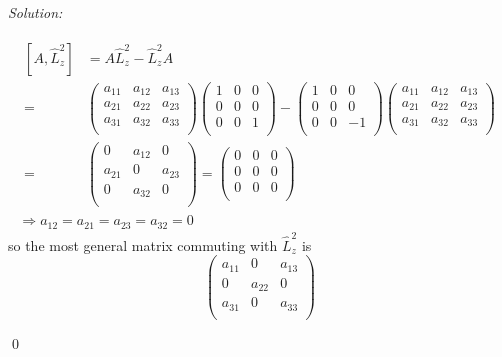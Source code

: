 \documentclass[12pt,a4paper]{article}
\newenvironment{sol}
    {\emph{Solution:}
    }
    {
    \qed
    }
\begin{document}
\begin{sol}
\begin{itemize}
\begin{gather}
\begin{align}
\nonumber[A,\hat{L}_z^2]&=A\hat{L}_z^2-\hat{L}_z^2A\\
\nonumber=&\left(\begin{array}{ccc}
a_{11}&a_{12}&a_{13}\\
a_{21}&a_{22}&a_{23}\\
a_{31}&a_{32}&a_{33}\\
\end{array}\right)\left(\begin{array}{ccc}
1&0&0\\
0&0&0\\
0&0&1\\
\end{array}\right)-\left(\begin{array}{ccc}
1&0&0\\
0&0&0\\
0&0&-1\\
\end{array}\right)\left(\begin{array}{ccc}
a_{11}&a_{12}&a_{13}\\
a_{21}&a_{22}&a_{23}\\
a_{31}&a_{32}&a_{33}\\
\end{array}\right)\\
=&\left(\begin{array}{ccc}
0&a_{12}&0\\
a_{21}&0&a_{23}\\
0&a_{32}&0\\
\end{array}\right)=\left(\begin{array}{ccc}
0&0&0\\
0&0&0\\
0&0&0\\
\end{array}\right)
\end{align}\\
\Longrightarrow a_{12}=a_{21}=a_{23}=a_{32}=0
\end{gather}
so the most general matrix commuting with $\hat{L}_z^2$ is
\begin{equation}
\left(\begin{array}{ccc}
a_{11}&0&a_{13}\\
0&a_{22}&0\\
a_{31}&0&a_{33}\\
\end{array}\right)
\end{equation}

\end{itemize}
\end{sol}
\end{document}
